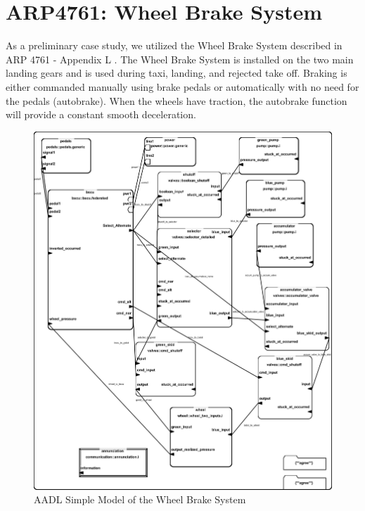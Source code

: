\section{ARP4761: Wheel Brake System}


As a preliminary case study, we utilized the Wheel Brake System described in ARP 4761 - Appendix L \cite{AIR6110}. The Wheel Brake System is installed on the two main landing gears and is used during taxi, landing, and rejected take off. Braking is either commanded manually using brake pedals or automatically with no need for the pedals (autobrake). When the wheels have traction, the autobrake function will provide a constant smooth deceleration.


\begin{figure}
\begin{center}
\includegraphics[width=\textwidth,scale=.17]{images/wbsfederated3.jpg}
\caption{AADL Simple Model of the Wheel Brake System }
\label{fig:wbs_ima}
\end{center}
\end{figure}

